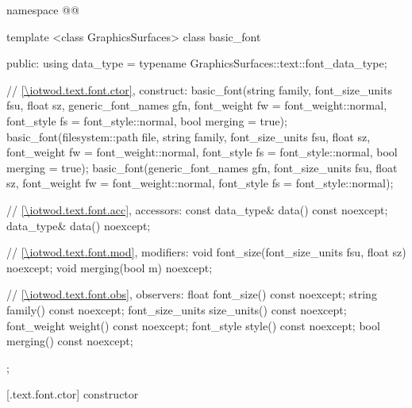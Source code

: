 \begin{codeblock}
namespace @\fullnamespace{}@ {
  template <class GraphicsSurfaces>
  class basic_font {
  public:
    using data_type = typename GraphicsSurfaces::text::font_data_type;

    // \ref{\iotwod.text.font.ctor}, construct:
    basic_font(string family, font_size_units fsu, float sz,
      generic_font_names gfn, font_weight fw = font_weight::normal,
      font_style fs = font_style::normal, bool merging = true);
    basic_font(filesystem::path file, string family, font_size_units fsu,
      float sz, font_weight fw = font_weight::normal, font_style fs = 
      font_style::normal, bool merging = true);
    basic_font(generic_font_names gfn, font_size_units fsu, float sz, 
      font_weight fw = font_weight::normal, font_style fs = font_style::normal);

    // \ref{\iotwod.text.font.acc}, accessors:
    const data_type& data() const noexcept;
    data_type& data() noexcept;

    // \ref{\iotwod.text.font.mod}, modifiers:
    void font_size(font_size_units fsu, float sz) noexcept;
    void merging(bool m) noexcept;

    // \ref{\iotwod.text.font.obs}, observers:
    float font_size() const noexcept;
    string family() const noexcept;
    font_size_units size_units() const noexcept;
    font_weight weight() const noexcept;
    font_style style() const noexcept;
    bool merging() const noexcept;
  };
}
\end{codeblock}

 [\iotwod.text.font.ctor] { constructor}


